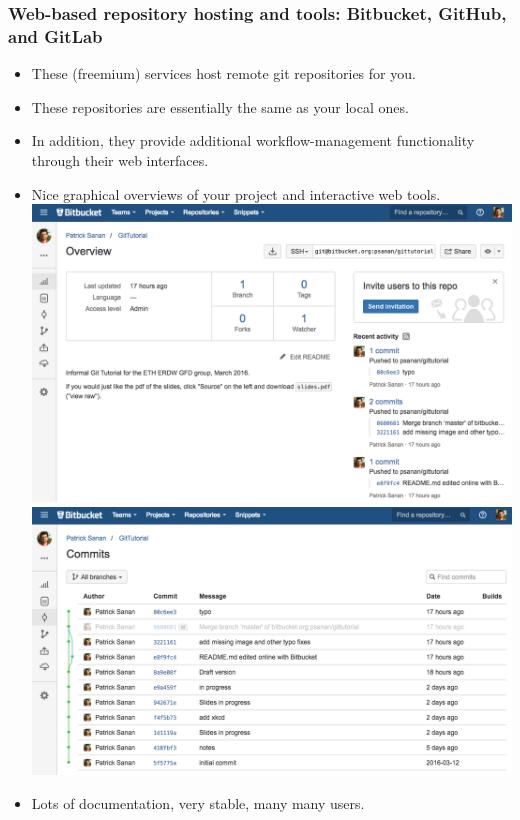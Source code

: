 \documentclass{beamer}
\begin{document}
\begin{frame}[fragile]
\frametitle{Web-based repository hosting and tools: Bitbucket, GitHub, and GitLab}
\begin{itemize}
\item These (freemium) services host remote git repositories for you.
\item These repositories are essentially the same as your local ones.
\item In addition, they provide additional workflow-management functionality through their web interfaces.
\item Nice graphical overviews of your project and interactive web tools.
\includegraphics[scale=0.15]{bitbucket2}
\includegraphics[scale=0.15]{bitbucket3}
\item Lots of documentation, very stable, many many users.
\end{itemize}
\end{frame}
\end{document}
